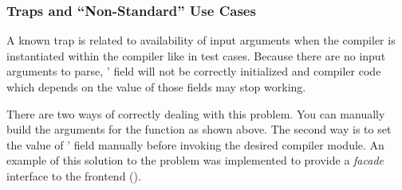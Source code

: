\subsubsection{Traps and ``Non-Standard'' Use Cases}
A known trap is related to availability of input arguments when the compiler is
instantiated within the compiler like in test cases. Because there are no input
arguments to parse, ' field will not be correctly
initialized and compiler code which depends on the value of those fields may
stop working. 

There are two ways of correctly dealing with this problem. You can manually
build the arguments for the  function as shown above.  The
second way is to set the value of ' field manually
before invoking the desired compiler module. An example of this solution to the
problem was implemented to provide a \emph{facade} interface to the frontend
().

